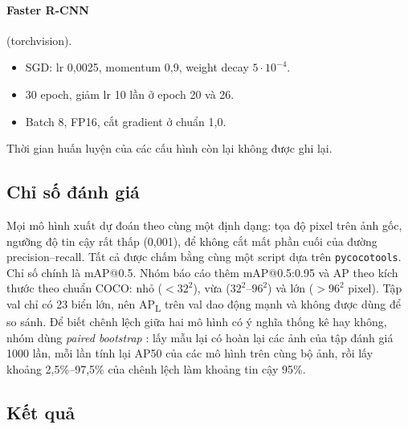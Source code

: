 \paragraph{Faster R-CNN} (torchvision).
\begin{itemize}
\item SGD: lr 0,0025, momentum 0,9, weight decay $5 \cdot 10^{-4}$.
\item 30 epoch, giảm lr 10 lần ở epoch 20 và 26.
\item Batch 8, FP16, cắt gradient ở chuẩn 1,0.
\end{itemize}
Thời gian huấn luyện của các cấu hình còn lại không được ghi lại.

\subsection{Chỉ số đánh giá}
\label{sec:metrics}

Mọi mô hình xuất dự đoán theo cùng một định dạng: tọa độ pixel trên ảnh gốc, ngưỡng độ tin cậy rất thấp (0,001), để không cắt mất phần cuối của đường precision--recall.
Tất cả được chấm bằng cùng một script dựa trên \texttt{pycocotools}.
Chỉ số chính là mAP@0.5. Nhóm báo cáo thêm mAP@0.5:0.95 và AP theo kích thước theo chuẩn COCO: nhỏ ($< 32^2$), vừa ($32^2$--$96^2$) và lớn ($> 96^2$ pixel).
Tập val chỉ có 23 biển lớn, nên AP\textsubscript{L} trên val dao động mạnh và không được dùng để so sánh.
Để biết chênh lệch giữa hai mô hình có ý nghĩa thống kê hay không, nhóm dùng \emph{paired bootstrap} \citep{efron1993bootstrap}: lấy mẫu lại có hoàn lại các ảnh của tập đánh giá 1000 lần, mỗi lần tính lại AP50 của các mô hình trên cùng bộ ảnh, rồi lấy khoảng 2,5\%--97,5\% của chênh lệch làm khoảng tin cậy 95\%.

\subsection{Kết quả}
\label{sec:results}

